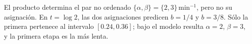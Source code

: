 El producto determina el par no ordenado \(\{\alpha,\beta\}=\{2,3\}\,\mathrm{min}^{-1}\), pero no su asignación. En \(t=\log2\), las dos asignaciones predicen \(b=1/4\) y \(b=3/8\). Sólo la primera pertenece al intervalo \([0.24,0.36]\); bajo el modelo resulta \(\alpha=2\), \(\beta=3\), y la primera etapa es la más lenta.
